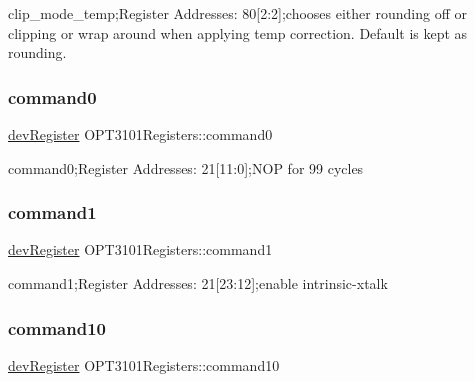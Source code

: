 clip\+\_\+mode\+\_\+temp;Register Addresses\+: 80\mbox{[}2\+:2\mbox{]};chooses either rounding off or clipping or wrap around when applying temp correction. Default is kept as rounding. 

\mbox{\label{class_o_p_t3101_registers_a996a3fec72692cb2d83981872a1e2bbf}} 
\subsubsection{\texorpdfstring{command0}{command0}}
{\footnotesize\ttfamily \mbox{\hyperlink{classdev_register}{dev\+Register}} O\+P\+T3101\+Registers\+::command0}



command0;Register Addresses\+: 21\mbox{[}11\+:0\mbox{]};N\+OP for 99 cycles 

\mbox{\label{class_o_p_t3101_registers_a0245e363165029a02c847f8a7301da0a}} 
\subsubsection{\texorpdfstring{command1}{command1}}
{\footnotesize\ttfamily \mbox{\hyperlink{classdev_register}{dev\+Register}} O\+P\+T3101\+Registers\+::command1}



command1;Register Addresses\+: 21\mbox{[}23\+:12\mbox{]};enable intrinsic-\/xtalk 

\mbox{\label{class_o_p_t3101_registers_a331f6fdaebe58dcd6c2e3877eee80e13}} 
\subsubsection{\texorpdfstring{command10}{command10}}
{\footnotesize\ttfamily \mbox{\hyperlink{classdev_register}{dev\+Register}} O\+P\+T3101\+Registers\+::command10}



